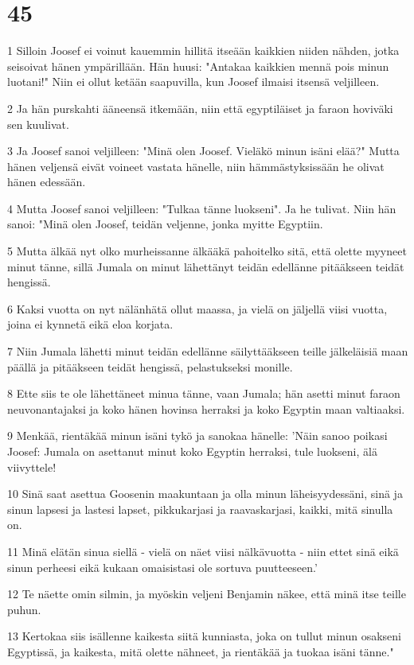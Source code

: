 \chapter{45}

\par 1 Silloin Joosef ei voinut kauemmin hillitä itseään kaikkien niiden nähden, jotka seisoivat hänen ympärillään. Hän huusi: "Antakaa kaikkien mennä pois minun luotani!" Niin ei ollut ketään saapuvilla, kun Joosef ilmaisi itsensä veljilleen.
\par 2 Ja hän purskahti ääneensä itkemään, niin että egyptiläiset ja faraon hoviväki sen kuulivat.
\par 3 Ja Joosef sanoi veljilleen: "Minä olen Joosef. Vieläkö minun isäni elää?" Mutta hänen veljensä eivät voineet vastata hänelle, niin hämmästyksissään he olivat hänen edessään.
\par 4 Mutta Joosef sanoi veljilleen: "Tulkaa tänne luokseni". Ja he tulivat. Niin hän sanoi: "Minä olen Joosef, teidän veljenne, jonka myitte Egyptiin.
\par 5 Mutta älkää nyt olko murheissanne älkääkä pahoitelko sitä, että olette myyneet minut tänne, sillä Jumala on minut lähettänyt teidän edellänne pitääkseen teidät hengissä.
\par 6 Kaksi vuotta on nyt nälänhätä ollut maassa, ja vielä on jäljellä viisi vuotta, joina ei kynnetä eikä eloa korjata.
\par 7 Niin Jumala lähetti minut teidän edellänne säilyttääkseen teille jälkeläisiä maan päällä ja pitääkseen teidät hengissä, pelastukseksi monille.
\par 8 Ette siis te ole lähettäneet minua tänne, vaan Jumala; hän asetti minut faraon neuvonantajaksi ja koko hänen hovinsa herraksi ja koko Egyptin maan valtiaaksi.
\par 9 Menkää, rientäkää minun isäni tykö ja sanokaa hänelle: 'Näin sanoo poikasi Joosef: Jumala on asettanut minut koko Egyptin herraksi, tule luokseni, älä viivyttele!
\par 10 Sinä saat asettua Goosenin maakuntaan ja olla minun läheisyydessäni, sinä ja sinun lapsesi ja lastesi lapset, pikkukarjasi ja raavaskarjasi, kaikki, mitä sinulla on.
\par 11 Minä elätän sinua siellä - vielä on näet viisi nälkävuotta - niin ettet sinä eikä sinun perheesi eikä kukaan omaisistasi ole sortuva puutteeseen.'
\par 12 Te näette omin silmin, ja myöskin veljeni Benjamin näkee, että minä itse teille puhun.
\par 13 Kertokaa siis isällenne kaikesta siitä kunniasta, joka on tullut minun osakseni Egyptissä, ja kaikesta, mitä olette nähneet, ja rientäkää ja tuokaa isäni tänne."
